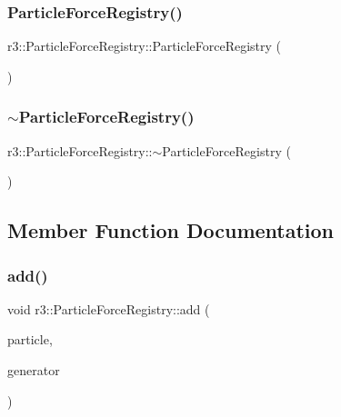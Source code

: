 \subsubsection{\texorpdfstring{Particle\+Force\+Registry()}{ParticleForceRegistry()}}
{\footnotesize\ttfamily r3\+::\+Particle\+Force\+Registry\+::\+Particle\+Force\+Registry (\begin{DoxyParamCaption}{ }\end{DoxyParamCaption})\hspace{0.3cm}{\ttfamily [explicit]}}

\mbox{\label{classr3_1_1_particle_force_registry_aa1fb5af3138a91474810858e52f5a21c}} 
\subsubsection{\texorpdfstring{$\sim$\+Particle\+Force\+Registry()}{~ParticleForceRegistry()}}
{\footnotesize\ttfamily r3\+::\+Particle\+Force\+Registry\+::$\sim$\+Particle\+Force\+Registry (\begin{DoxyParamCaption}{ }\end{DoxyParamCaption})}



\subsection{Member Function Documentation}
\mbox{\label{classr3_1_1_particle_force_registry_a11cb053992645af9af2ccd5f98783cae}} 
\subsubsection{\texorpdfstring{add()}{add()}}
{\footnotesize\ttfamily void r3\+::\+Particle\+Force\+Registry\+::add (\begin{DoxyParamCaption}\item[{\mbox{\hyperlink{classr3_1_1_particle}{Particle}} $\ast$}]{particle,  }\item[{\mbox{\hyperlink{classr3_1_1_i_particle_force_generator}{I\+Particle\+Force\+Generator}} $\ast$}]{generator }\end{DoxyParamCaption})}



